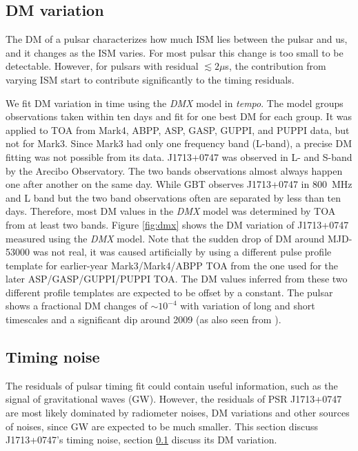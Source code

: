 \subsection{DM variation}
\label{sec:dmx}
The DM of a pulsar characterizes how much ISM lies
between the pulsar and us, and it changes as the ISM varies. For most pulsar
this change is too small to be detectable. However, for pulsars with residual
$\lesssim2\mu$s, the contribution from varying ISM start to contribute
significantly to the timing residuals. 

We fit DM variation in time using the {\it DMX} model in {\it tempo}.
The model groups observations taken within ten days and fit for one
best DM for each group.   
It was applied to TOA from Mark4, ABPP, ASP, GASP, GUPPI, and PUPPI data, but
not for Mark3. Since Mark3 had only one frequency band (L-band), a precise DM
fitting was not possible from its data.
J1713+0747 was observed in L- and S-band by the Arecibo Observatory. The
two bands observations almost always happen one after another on the same day.
While GBT observes J1713+0747 in 800~MHz and L band but the two band
observations often are separated by less than ten days.
Therefore, most DM values in the {\it DMX} model was determined by TOA from at
least two bands. Figure \ref{fig:dmx} shows the DM variation of J1713+0747 
measured using the {\it DMX} model.
Note that the sudden drop of DM around MJD-53000 was not real, it was caused
artificially by using a different pulse profile template for earlier-year Mark3/Mark4/ABPP TOA 
from the one used for the later
ASP/GASP/GUPPI/PUPPI TOA. The DM values inferred from these two different profile
templates are expected to be offset by a constant.
The pulsar shows a fractional DM changes of $\sim10^{-4}$ with variation of
long and short timescales and a significant dip around 2009 (as also seen from
\citealt{dfg+13}).



\subsection{Timing noise}
\label{sec:noise}
The residuals of pulsar timing fit could contain useful information,
such as the signal of gravitational waves (GW). However, the residuals of PSR
J1713+0747 are most likely dominated by radiometer noises, DM variations and other
sources of noises, since GW are expected 
to be much smaller.  This
section discuss J1713+0747's timing noise, section \ref{sec:dmx} discuss its DM
variation.


